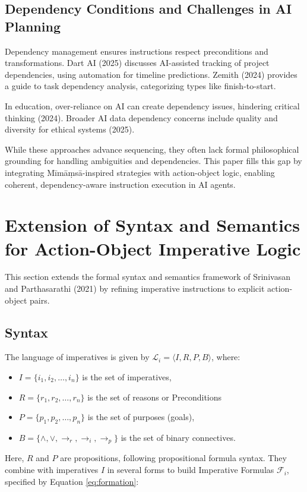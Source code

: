 \documentclass[a4paper,11pt]{lmcs}
\begin{document}
\subsection{Dependency Conditions and Challenges in AI Planning}

Dependency management ensures instructions respect preconditions and transformations. Dart AI (2025) discusses AI-assisted tracking of project dependencies, using automation for timeline predictions. Zemith (2024) provides a guide to task dependency analysis, categorizing types like finish-to-start.

In education, over-reliance on AI can create dependency issues, hindering critical thinking (2024). Broader AI data dependency concerns include quality and diversity for ethical systems (2025).

While these approaches advance sequencing, they often lack formal philosophical grounding for handling ambiguities and dependencies. This paper fills this gap by integrating Mīmāṃsā-inspired strategies with action-object logic, enabling coherent, dependency-aware instruction execution in AI agents.

\section{Extension of Syntax and Semantics for Action-Object Imperative Logic}
This section extends the formal syntax and semantics framework of Srinivasan and Parthasarathi (2021) \cite{mira} by refining imperative instructions to explicit action-object pairs.
\subsection{Syntax}
\label{sec:syntax}
The language of imperatives is given by \(\mathcal{L}_i = \langle I, R, P, B \rangle\), where:
\begin{itemize}
  \item \(I = \{ i_1, i_2, \ldots, i_n \}\) is the set of imperatives,
  \item \(R = \{ r_1, r_2, \ldots, r_n \}\) is the set of reasons or Preconditions
  \item \(P = \{ p_1, p_2, \ldots, p_n \}\) is the set of purposes (goals),
  \item \(B = \{ \wedge, \vee, \rightarrow_r, \rightarrow_i, \rightarrow_p \}\) is the set of binary connectives.
\end{itemize}

Here, \(R\) and \(P\) are propositions, following propositional formula syntax. They combine with imperatives \(I\) in several forms to build Imperative Formulas \(\mathcal{F}_i\), specified by Equation \ref{eq:formation}:
\end{document}
